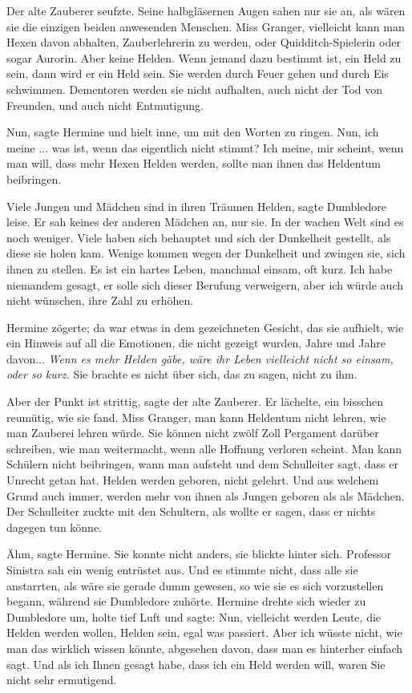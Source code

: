 Der alte Zauberer seufzte. Seine halbgläsernen Augen sahen nur sie an, als wären
sie die einzigen beiden anwesenden Menschen. \glqq Miss Granger, vielleicht kann
man Hexen davon abhalten, Zauberlehrerin zu werden, oder Quidditch-Spielerin
oder sogar Aurorin. Aber keine Helden. Wenn jemand dazu bestimmt ist, ein Held
zu sein, dann wird er ein Held sein. Sie werden durch Feuer gehen und durch Eis
schwimmen. Dementoren werden sie nicht aufhalten, auch nicht der Tod von
Freunden, und auch nicht Entmutigung.\grqq{}

\glqq Nun\grqq{}, sagte Hermine und hielt inne, um mit den Worten zu ringen.
\glqq Nun, ich meine ... was ist, wenn das eigentlich nicht stimmt? Ich meine,
mir scheint, wenn man will, dass mehr Hexen Helden werden, sollte man ihnen das
Heldentum beibringen.\grqq{}

\glqq Viele Jungen und Mädchen sind in ihren Träumen Helden\grqq{}, sagte
Dumbledore leise. Er sah keines der anderen Mädchen an, nur sie. \glqq In der
wachen Welt sind es noch weniger. Viele haben sich behauptet und sich der
Dunkelheit gestellt, als diese sie holen kam. Wenige kommen wegen der Dunkelheit
und zwingen sie, sich ihnen zu stellen. Es ist ein hartes Leben, manchmal
einsam, oft kurz. Ich habe niemandem gesagt, er solle sich dieser Berufung
verweigern, aber ich würde auch nicht wünschen, ihre Zahl zu erhöhen.\grqq{}

Hermine zögerte; da war etwas in dem gezeichneten Gesicht, das sie aufhielt, wie
ein Hinweis auf all die Emotionen, die nicht gezeigt wurden, Jahre und Jahre
davon... \emph{Wenn es mehr Helden gäbe, wäre ihr Leben vielleicht nicht so
einsam, oder so kurz.} Sie brachte es nicht über sich, das zu sagen, nicht zu
ihm.

\glqq Aber der Punkt ist strittig\grqq{}, sagte der alte Zauberer. Er lächelte,
ein bisschen reumütig, wie sie fand. \glqq Miss Granger, man kann Heldentum
nicht lehren, wie man Zauberei lehren würde. Sie können nicht zwölf Zoll
Pergament darüber schreiben, wie man weitermacht, wenn alle Hoffnung verloren
scheint. Man kann Schülern nicht beibringen, wann man aufsteht und dem
Schulleiter sagt, dass er Unrecht getan hat. Helden werden geboren, nicht
gelehrt. Und aus welchem Grund auch immer, werden mehr von ihnen als Jungen
geboren als als Mädchen.\grqq{} Der Schulleiter zuckte mit den Schultern, als
wollte er sagen, dass er nichts dagegen tun könne.

\glqq Ähm\grqq{}, sagte Hermine. Sie konnte nicht anders, sie blickte hinter
sich. Professor Sinistra sah ein wenig entrüstet aus. Und es stimmte nicht, dass
alle sie anstarrten, als wäre sie gerade dumm gewesen, so wie sie es sich
vorzustellen begann, während sie Dumbledore zuhörte. Hermine drehte sich wieder
zu Dumbledore um, holte tief Luft und sagte: \glqq Nun, vielleicht werden Leute,
die Helden werden wollen, Helden sein, egal was passiert. Aber ich wüsste nicht,
wie man das wirklich wissen könnte, abgesehen davon, dass man es hinterher
einfach sagt. Und als ich Ihnen gesagt habe, dass ich ein Held werden will,
waren Sie nicht sehr ermutigend.\grqq{}


